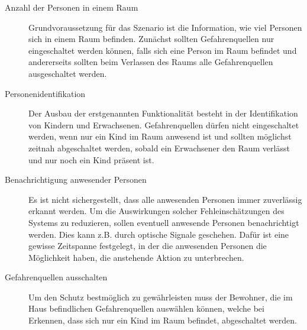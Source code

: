 \begin{description}
	\item [Anzahl der Personen in einem Raum] Grundvoraussetzung für das Szenario ist die Information, wie viel Personen sich in einem Raum befinden. Zunächst sollten Gefahrenquellen nur eingeschaltet werden können, falls sich eine Person im Raum befindet und andererseits sollten beim Verlassen des Raums alle Gefahrenquellen ausgeschaltet werden.
	\item [Personenidentifikation] Der Ausbau der erstgenannten Funktionalität besteht in der Identifikation von Kindern und Erwachsenen. Gefahrenquellen dürfen nicht eingeschaltet werden, wenn nur ein Kind im Raum anwesend ist und sollten möglichst zeitnah abgeschaltet werden, sobald ein Erwachsener den Raum verlässt und nur noch ein Kind präsent ist.
	\item [Benachrichtigung anwesender Personen] Es ist nicht sichergestellt, dass alle anwesenden Personen immer zuverlässig erkannt werden. Um die Auswirkungen solcher Fehleinschätzungen des Systems zu reduzieren, sollen eventuell anwesende Personen benachrichtigt werden. Dies kann z.B. durch optische Signale geschehen. Dafür ist eine gewisse Zeitspanne festgelegt, in der die anwesenden Personen die Möglichkeit haben, die anstehende Aktion zu unterbrechen.
	\item [Gefahrenquellen ausschalten] Um den Schutz bestmöglich zu gewährleisten muss der Bewohner, die im Haus befindlichen Gefahrenquellen auswählen können, welche bei Erkennen, dass sich nur ein Kind im Raum befindet, abgeschaltet werden.
\end{description}


